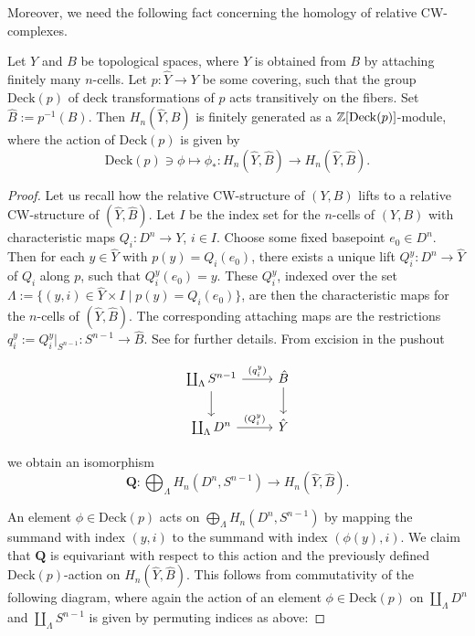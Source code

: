 Moreover, we need the following fact concerning the homology of relative CW-complexes.

\begin{lemma}
    \label{appendix2:lem:finite_generated_homology}
Let $Y$ and $B$ be topological spaces, where $Y$ is obtained from $B$ by attaching finitely many $n$-cells. Let $p \colon \hat{Y} \to Y$ be some covering, such that the group $\mathrm{Deck}(p)$ of deck transformations of $p$ acts transitively on the fibers. Set $\hat{B} := p^{-1}(B)$. Then $H_n(\hat{Y},\hat{B})$ is finitely generated as a $\mathbb{Z}[\mathrm{Deck}(p)]$-module, where the action of $\mathrm{Deck}(p)$ is given by 
\[
\mathrm{Deck}(p) \ni \phi \mapsto \phi_\ast \colon H_n(\hat{Y},\hat{B}) \to H_n(\hat{Y},\hat{B}).
\]
\end{lemma}

\begin{proof}
Let us recall how the relative CW-structure of $(Y,B)$ lifts to a relative CW-structure of $(\hat{Y},\hat{B})$. Let $I$ be the index set for the $n$-cells of $(Y,B)$ with characteristic maps $Q_i \colon D^n \to Y$, $i \in I$. Choose some fixed basepoint $e_0 \in D^n$. Then for each $y \in \hat{Y}$ with $p(y) = Q_i(e_0)$, there exists a unique lift $Q_i^y \colon D^n \to \hat{Y}$ of $Q_i$ along $p$, such that $Q_i^y(e_0) = y$. These $Q_i^y$, indexed over the set
$\Lambda := \{(y,i) \in \hat{Y} \times I \mid p(y) = Q_i(e_0)\}$,
are then the characteristic maps for the $n$-cells of $(\hat{Y},\hat{B})$. The corresponding attaching maps are the restrictions $q_i^y := Q_i^y|_{S^{n-1}} \colon S^{n-1} \to \hat{B}$.
See \cite[Thm. 1.1.6]{fritsch1990cellular} for further details. \newpage \noindent From excision in the pushout

\[\begin{tikzcd}
{\coprod_{\Lambda}S^{n-1}} & {\hat{B}} \\
{\coprod_{\Lambda}D^n} & {\hat{Y}}
\arrow["{(q_i^y)}", from=1-1, to=1-2]
\arrow[from=1-1, to=2-1]
\arrow[from=1-2, to=2-2]
\arrow["{(Q_i^y)}", from=2-1, to=2-2]
\end{tikzcd}\]

\noindent we obtain an isomorphism
\[
\bm{Q} \colon \bigoplus_{\Lambda} H_n(D^n,S^{n-1}) \to H_n(\hat{Y},\hat{B}).
\]

An element $\phi \in \mathrm{Deck}(p)$ acts on $\bigoplus_{\Lambda} H_n(D^n,S^{n-1})$ by mapping the summand with index $(y,i)$ to the summand with index $(\phi(y),i)$. We claim that $\bm{Q}$ is equivariant with respect to this action and the previously defined $\mathrm{Deck}(p)$-action on $H_n(\hat{Y},\hat{B})$. This follows from commutativity of the following diagram, where again the action of an element $\phi \in \mathrm{Deck}(p)$ on $\coprod_{\Lambda} D^n$ and $\coprod_{\Lambda} S^{n-1}$ is given by permuting indices as above:


\end{proof}
